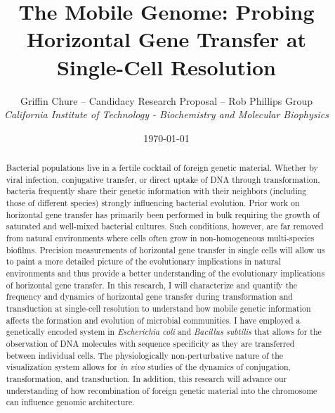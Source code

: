 


\title{The Mobile Genome: Probing Horizontal Gene Transfer at Single-Cell
Resolution}
\author{Griffin Chure -- Candidacy Research Proposal -- Rob Phillips Group\\
	\textit{\small California Institute of Technology - Biochemistry and Molecular
	Biophysics}}
\date{\today}


\maketitle

\begin{abstract}
	Bacterial populations live in a fertile cocktail of foreign
	genetic material. Whether by viral infection, conjugative transfer, or
	direct uptake of DNA through transformation, bacteria frequently share
	their genetic information with their neighbors (including those of
	different species) strongly influencing bacterial evolution. Prior work
	on horizontal gene transfer has primarily been performed in bulk requiring the
	growth of saturated and well-mixed bacterial cultures. Such conditions,
	however, are far removed from natural environments where cells often grow
	in non-homogeneous multi-species biofilms. Precision measurements of
	horizontal gene transfer in single cells will allow us to paint a more
	detailed picture of the evolutionary implications in natural
	environments and thus provide a better  understanding of the
	evolutionary implications of horizontal gene transfer. In this research,
	I will characterize and quantify the frequency and dynamics of
	horizontal gene transfer during transformation and transduction at
	single-cell resolution to understand how mobile genetic information
	affects the formation and evolution of microbial communities. I have
	employed a genetically encoded system in \textit{Escherichia coli} and
	\textit{Bacillus subtilis} that allows for the observation of DNA
	molecules with sequence specificity as they are transferred between
	individual cells. The physiologically non-perturbative nature of the
	visualization system allows for \textit{in vivo} studies of the dynamics
	of conjugation, transformation, and transduction. In addition, this
	research will advance our understanding of how recombination of foreign
	genetic material into the chromosome can influence genomic architecture.
\end{abstract}



